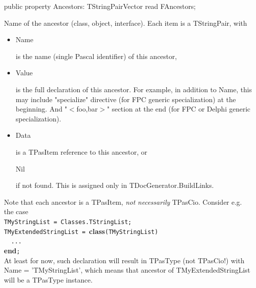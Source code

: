 \documentclass{report}
\newif\ifpdf
\begin{document}
\begin{list}{}{
\setlength{\itemindent}{0cm}
\setlength{\listparindent}{0cm}
\setlength{\leftmargin}{\evensidemargin}
\addtolength{\leftmargin}{\tmplength}
\settowidth{\labelsep}{X}
\addtolength{\leftmargin}{\labelsep}
\setlength{\labelwidth}{\tmplength}
}
\label{PasDoc_Items.TPasCio-Ancestors}
\item[\textbf{Ancestors}\hfill]
\ifpdf
\begin{flushleft}
\fi
\begin{ttfamily}
public property Ancestors: TStringPairVector read FAncestors;\end{ttfamily}

\ifpdf
\end{flushleft}
\fi


\par Name of the ancestor (class, object, interface). Each item is a TStringPair, with \begin{itemize}
\item \begin{ttfamily}Name\end{ttfamily} is the name (single Pascal identifier) of this ancestor,
\item \begin{ttfamily}Value\end{ttfamily} is the full declaration of this ancestor. For example, in addition to Name, this may include "specialize" directive (for FPC generic specialization) at the beginning. And "{$<$}foo,bar{$>$}" section at the end (for FPC or Delphi generic specialization).
\item \begin{ttfamily}Data\end{ttfamily} is a TPasItem reference to this ancestor, or \begin{ttfamily}Nil\end{ttfamily} if not found. This is assigned only in TDocGenerator.BuildLinks.
\end{itemize}

Note that each ancestor is a TPasItem, \textit{not necessarily} TPasCio. Consider e.g. the case \texttt{\\\nopagebreak[3]
TMyStringList~=~Classes.TStringList;\\\nopagebreak[3]
TMyExtendedStringList~=~}\textbf{class}\texttt{(TMyStringList)\\\nopagebreak[3]
~~...\\\nopagebreak[3]
}\textbf{end}\texttt{;\\
} At least for now, such declaration will result in TPasType (not TPasCio!) with Name = 'TMyStringList', which means that ancestor of TMyExtendedStringList will be a TPasType instance.


\end{list}
\end{document}
